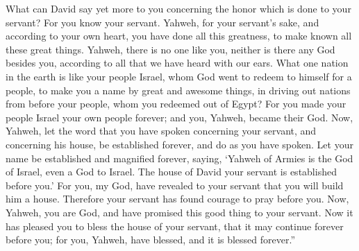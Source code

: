 {What can David say yet more to you concerning the honor which is done to your servant? For you know your servant.
Yahweh, for your servant’s sake, and according to your own heart, you have done all this greatness, to make known all these great things.
Yahweh, there is no one like you, neither is there any God besides you, according to all that we have heard with our ears.
What one nation in the earth is like your people Israel, whom God went to redeem to himself for a people, to make you a name by great and awesome things, in driving out nations from before your people, whom you redeemed out of Egypt?
For you made your people Israel your own people forever; and you, Yahweh, became their God.
Now, Yahweh, let the word that you have spoken concerning your servant, and concerning his house, be established forever, and do as you have spoken.
Let your name be established and magnified forever, saying, ‘Yahweh of Armies is the God of Israel, even a God to Israel. The house of David your servant is established before you.’
For you, my God, have revealed to your servant that you will build him a house. Therefore your servant has found courage to pray before you.
Now, Yahweh, you are God, and have promised this good thing to your servant.
Now it has pleased you to bless the house of your servant, that it may continue forever before you; for you, Yahweh, have blessed, and it is blessed forever.”

}
